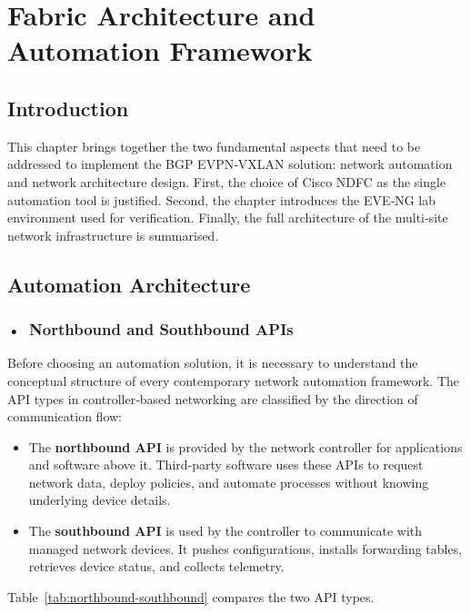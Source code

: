 \chapter{Fabric Architecture and Automation Framework}
\section{Introduction}
This chapter brings together the two fundamental aspects that need to be addressed to implement the BGP EVPN‑VXLAN solution: network automation and network architecture design. First, the choice of Cisco NDFC as the single automation tool is justified. Second, the chapter introduces the EVE‑NG lab environment used for verification. Finally, the full architecture of the multi‑site network infrastructure is summarised.

\section{Automation Architecture}

\subsection*{\mbox{•}~Northbound and Southbound APIs}
Before choosing an automation solution, it is necessary to understand the conceptual structure of every contemporary network automation framework. The API types in controller‑based networking are classified by the direction of communication flow:
\begin{itemize}
    \item The \textbf{northbound API} is provided by the network controller for applications and software above it. Third‑party software uses these APIs to request network data, deploy policies, and automate processes without knowing underlying device details.
    \item The \textbf{southbound API} is used by the controller to communicate with managed network devices. It pushes configurations, installs forwarding tables, retrieves device status, and collects telemetry.
\end{itemize}
Table~\ref{tab:northbound-southbound} compares the two API types.

